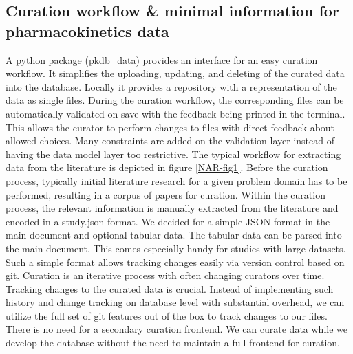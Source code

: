 \documentclass[a4,center,fleqn]{NAR}
\begin{document}
\subsection{Curation workflow \& minimal information for pharmacokinetics data}
A python package (pkdb\_data) provides an interface for an easy curation workflow.  It simplifies the uploading, updating, and deleting of the curated data into the database. Locally it provides a repository with a representation of the data as single files. During the curation workflow, the corresponding files can be automatically validated on save with the feedback being printed in the terminal. This allows the curator to perform changes to files with direct feedback about allowed choices. Many constraints are added on the validation layer instead of having the data model layer too restrictive.
The typical workflow for extracting data from the literature is depicted in figure \ref{NAR-fig1}. Before the curation process, typically initial literature research for a given problem domain has to be performed, resulting in a corpus of papers for curation. Within the curation process, the relevant information is manually extracted from the literature and encoded in a study.json format.  
We decided for a simple JSON format in the main document and optional tabular data. The tabular data can be parsed into the main document. This comes especially handy for studies with large datasets. Such a simple format allows tracking changes easily via version control based on git. Curation is an iterative process with often changing curators over time. Tracking changes to the curated data is crucial. Instead of implementing such history and change tracking on database level with substantial overhead, we can utilize the full set of git features out of the box to track changes to our files. There is no need for a secondary curation frontend. We can curate data while we develop the database without the need to maintain a full frontend for curation.
\end{document}
